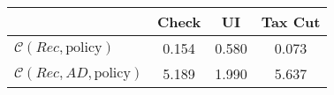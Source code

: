 \begin{tabular}{@{}lccc@{}}
\toprule
                          & Check      & UI    & Tax Cut    \\  \midrule
$\mathcal{C}(Rec,\text{policy})$ & 0.154  & 0.580  & 0.073     \\
$\mathcal{C}(Rec, AD,\text{policy})$ & 5.189  & 1.990  & 5.637     \\
\end{tabular}
